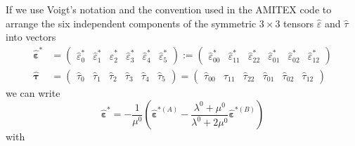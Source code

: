 \documentclass[11pt]{article}
\renewcommand{\vec}[1]{\boldsymbol{#1}}
\begin{document}
If we use Voigt's notation \cite{voigt1928lehrbuch} and the convention used in the AMITEX code to arrange the six independent components of the symmetric $3\times 3$ tensors $\widehat{\varepsilon}$ and $\widehat{\tau}$ into vectors
\begin{equation}
    \begin{aligned}
    \widehat{\vec{\varepsilon}}^* &=
    \begin{pmatrix}
        \widehat{\varepsilon}^*_{0} &
        \widehat{\varepsilon}^*_{1} &
        \widehat{\varepsilon}^*_{2} &
        \widehat{\varepsilon}^*_{3} &
        \widehat{\varepsilon}^*_{4} &
        \widehat{\varepsilon}^*_{5}
    \end{pmatrix}:= 
    \begin{pmatrix}
        \widehat{\varepsilon}^*_{00} &
        \widehat{\varepsilon}^*_{11} &
        \widehat{\varepsilon}^*_{22} &
        \widehat{\varepsilon}^*_{01} &
        \widehat{\varepsilon}^*_{02} &
        \widehat{\varepsilon}^*_{12}
    \end{pmatrix}\\
    \widehat{\vec{\tau}} &= 
    \begin{pmatrix}
        \widehat{\tau}_{0} &
        \widehat{\tau}_{1} &
        \widehat{\tau}_{2} &
        \widehat{\tau}_{3} &
        \widehat{\tau}_{4} &
        \widehat{\tau}_{5}
    \end{pmatrix}= 
    \begin{pmatrix}
        \widehat{\tau}_{00} &
        \widehat{\tau}_{11} &
        \widehat{\tau}_{22} &
        \widehat{\tau}_{01} &
        \widehat{\tau}_{02} &
        \widehat{\tau}_{12}
    \end{pmatrix}
\end{aligned}
\end{equation}
we can write
\begin{equation}
\widehat{\vec{\varepsilon}}^* = -\frac{1}{\mu^0}\left(\widehat{\vec{\varepsilon}}^{*(A)} - \frac{\lambda^0+\mu^0}{\lambda^0+2\mu^0} \widehat{\vec{\varepsilon}}^{*(B)}\right)
\end{equation}
with 
\end{document}
